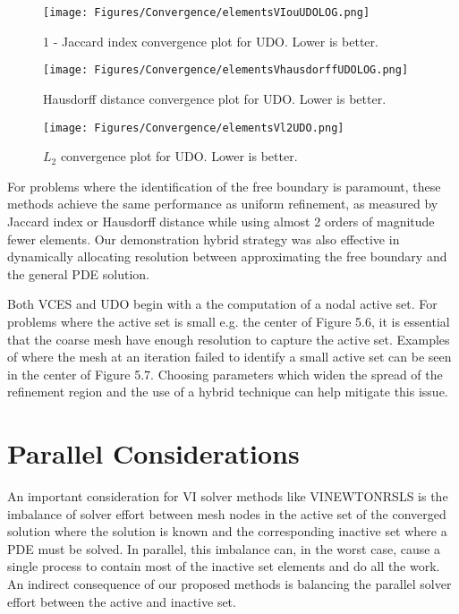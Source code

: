 \documentclass[12 pt]{report}
\begin{document}
\begin{figure}[H]
  \centering
  \texttt{[image: Figures/Convergence/elementsVIouUDOLOG.png]}
  \caption{1 - Jaccard index convergence plot for UDO. Lower is better.} 
\end{figure} 



\begin{figure}[H]
  \centering
  \texttt{[image: Figures/Convergence/elementsVhausdorffUDOLOG.png]}
  \caption{Hausdorff distance convergence plot for UDO. Lower is better.} 
\end{figure} 


\begin{figure}[H]
  \centering
  \texttt{[image: Figures/Convergence/elementsVl2UDO.png]}
  \caption{$L_2$ convergence plot for UDO. Lower is better.} 
\end{figure} 

For problems where the identification of the free boundary is paramount, these methods achieve the same performance as uniform refinement, as measured by Jaccard index or Hausdorff distance while using almost 2 orders of magnitude fewer elements. Our demonstration hybrid strategy was also effective in dynamically allocating resolution between approximating the free boundary and the general PDE solution. 

Both VCES and UDO begin with a the computation of a nodal active set. For problems where the active set is small e.g. the center of Figure 5.6, it is essential that the coarse mesh have enough resolution to capture the active set. Examples of where the mesh at an iteration failed to identify a small active set can be seen in the center of Figure 5.7. Choosing parameters which widen the spread of the refinement region and the use of a hybrid technique can help mitigate this issue. 




\section{Parallel Considerations}
An important consideration for VI solver methods like VINEWTONRSLS is the imbalance of solver effort between mesh nodes in the active set of the converged solution where the solution is known and the corresponding inactive set where a PDE must be solved. In parallel, this imbalance can, in the worst case, cause a single process to contain most of the inactive set elements and do all the work. An indirect consequence of our proposed methods is balancing the parallel solver effort between the active and inactive set.
\end{document}
